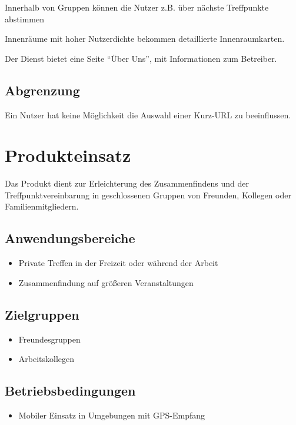 \documentclass[parskip=full,11pt,twoside]{scrartcl}
\begin{document}
Innerhalb von Gruppen können die Nutzer z.B. über nächste Treffpunkte abstimmen

Innenräume mit hoher Nutzerdichte bekommen detaillierte Innenraumkarten.

Der Dienst bietet eine Seite \enquote{Über Uns},
mit Informationen zum Betreiber.

\subsection{Abgrenzung}

Ein Nutzer hat keine Möglichkeit die Auswahl einer Kurz-URL zu beeinflussen.

\pagebreak
\section{Produkteinsatz}
Das Produkt dient zur Erleichterung des Zusammenfindens und der
Treffpunktvereinbarung in geschlossenen Gruppen von Freunden, Kollegen oder
Familienmitgliedern.

\subsection{Anwendungsbereiche}
\begin{itemize}
    \item Private Treffen in der Freizeit oder während der Arbeit
    \item Zusammenfindung auf größeren Veranstaltungen
\end{itemize}

\subsection{Zielgruppen}
\begin{itemize}
    \item Freundesgruppen
    \item Arbeitskollegen
\end{itemize}

\subsection{Betriebsbedingungen}
\begin{itemize}
    \item Mobiler Einsatz in Umgebungen mit GPS-Empfang
\end{itemize}
\end{document}
